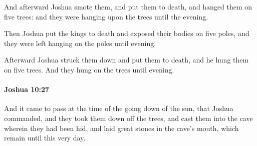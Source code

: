 			\begin{versebox}
					\item[BHS] 
					\item[ASV] And afterward Joshua smote them, and put them to death, and hanged them on five trees: and they were hanging upon the trees until the evening.
					\item[NIV] Then Joshua put the kings to death and exposed their bodies on five poles, and they were left hanging on the poles until evening.
					\item[NRSV] Afterward Joshua struck them down and put them to death, and he hung them on five trees. And they hung on the trees until evening.
			\end{versebox}

		\paragraph{Joshua 10:27} %
			\label{JOSHUA-10-27}

			And it came to pass at the time of the going down of the sun, that Joshua commanded, and they took them down off the trees, and cast them into the cave wherein they had been hid, and laid great stones in the cave’s mouth, which remain until this very day.

